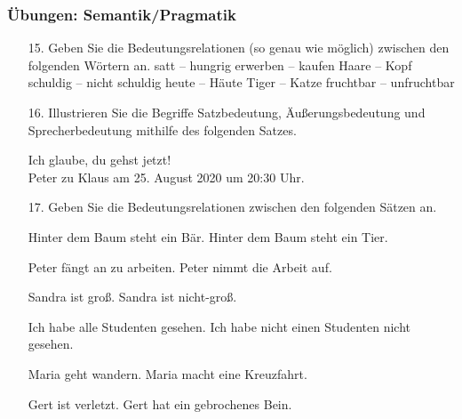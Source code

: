 \begin{frame}
\frametitle{Übungen: Semantik/Pragmatik}

\begin{itemize}
	\item[15.] Geben Sie die Bedeutungsrelationen (so genau wie möglich) zwischen den folgenden Wörtern an.
	\eal \label{ex:15}
	\ex satt -- hungrig
	\ex erwerben -- kaufen
	\ex Haare -- Kopf
	\ex schuldig -- nicht schuldig
	\ex heute -- Häute
	\ex Tiger -- Katze
	\ex fruchtbar -- unfruchtbar
	\zl
	
	\item[16.] Illustrieren Sie die Begriffe Satzbedeutung, Äußerungsbedeutung und Sprecherbedeutung mithilfe des folgenden Satzes.
	
	\ea \label{ex:16} Ich glaube, du gehst jetzt! \\
	\ras Peter zu Klaus am 25. August 2020 um 20:30 Uhr.
	\z
	
\end{itemize}

\end{frame}


\begin{frame}

\begin{itemize}
	\item[17.] Geben Sie die Bedeutungsrelationen zwischen den folgenden Sätzen an.
	
	\eal \label{ex:17}
	\ex Hinter dem Baum steht ein Bär.
	\ex Hinter dem Baum steht ein Tier.
	\zl
	
	\eal \label{ex:18}
	\ex Peter fängt an zu arbeiten.
	\ex Peter nimmt die Arbeit auf.
	\zl
	
	\eal \label{ex:19}
	\ex Sandra ist groß.
	\ex Sandra ist nicht-groß.
	\zl
	
	\eal \label{ex:20}
	\ex Ich habe alle Studenten gesehen.
	\ex Ich habe nicht einen Studenten nicht gesehen.
	\zl
	
	\eal \label{ex:21}
	\ex Maria geht wandern.
	\ex Maria macht eine Kreuzfahrt.
	\zl
	
	\eal \label{ex:22}
	\ex Gert ist verletzt.
	\ex Gert hat ein gebrochenes Bein.
	\zl
	
\end{itemize}

\end{frame}


